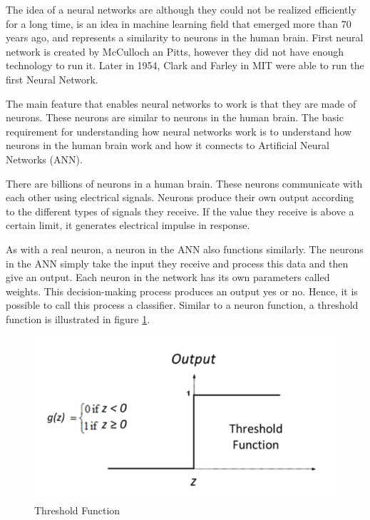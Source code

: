The idea of a neural networks are although they could not be realized efficiently for a long time, is an idea in machine learning field that emerged more than 70 years ago, and represents a similarity to neurons in the human brain. First neural network is created by McCulloch an Pitts, however they did not have enough technology to run it. Later in 1954, Clark and Farley in MIT were able to run the first Neural Network.

The main feature that enables neural networks to work is that they are made of neurons. These neurons are similar to neurons in the human brain. The basic requirement for understanding how neural networks work is to understand how neurons in the human brain work and how it connects to Artificial Neural Networks (ANN).

There are billions of neurons in a human brain. These neurons communicate with each other using electrical signals. Neurons produce their own output according to the different types of signals they receive. If the value they receive is above a certain limit, it generates electrical impulse in response.

As with a real neuron, a neuron in the ANN also functions similarly. The neurons in the ANN simply take the input they receive and process this data and then give an output. Each neuron in the network has its own parameters called weights. This decision-making process produces an output yes or no. Hence, it is possible to call this process a classifier. Similar to a neuron function, a threshold function is illustrated in figure \ref{fig:threshold}.

\begin{figure}[h!]
    \centering
    \includegraphics[scale=0.7]{figures/chapter3/threshol.png}
    \caption{Threshold Function}
    \label{fig:threshold}
\end{figure}

